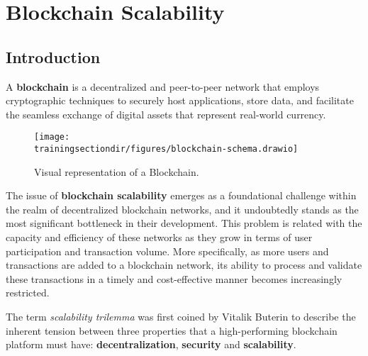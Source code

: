 \section{Blockchain Scalability}




\subsection{Introduction}

A \textbf{blockchain} is a decentralized and peer-to-peer network that employs cryptographic techniques to securely host applications, store data, and facilitate the seamless exchange of digital assets that represent real-world currency.

\begin{figure}[H]
\centering
\texttt{[image: \\trainingsectiondir/figures/blockchain-schema.drawio]}
\caption{Visual representation of a Blockchain.}
\end{figure}


The issue of \textbf{blockchain scalability} emerges as a foundational challenge within the realm of decentralized blockchain networks, and it undoubtedly stands as the most significant bottleneck in their development. This problem is related with the capacity and efficiency of these networks as they grow in terms of user participation and transaction volume. More specifically, as more users and transactions are added to a blockchain network, its ability to process and validate these transactions in a timely and cost-effective manner becomes increasingly restricted.

The term \textit{scalability trilemma} was first coined by Vitalik Buterin to describe the inherent tension between three properties that a high-performing blockchain platform must have: \textbf{decentralization}, \textbf{security} and \textbf{scalability}.

